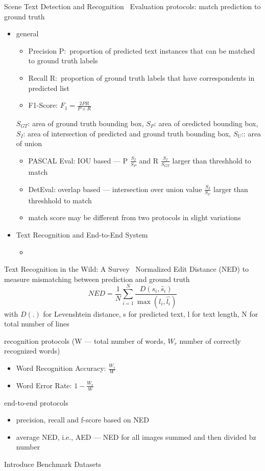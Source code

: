 Scene Text Detection and Recognition~\citep{long_scene_2021}
Evaluation protocols: match prediction to ground truth
\begin{itemize}
    \item general
        \begin{itemize}
            \item Precision P:\ proportion of predicted text instances that can be matched to ground
                truth labels
            \item Recall R:\ proportion of ground truth labels that have correspondents in predicted
                list
            \item F1-Score: $F_1=\frac{2PR}{P+R}$
        \end{itemize}
        $S_{GT}$: area of ground truth bounding box, $S_P$: area of oredicted bounding box,
        $S_I$: area of intersection of predicted and ground truth bounding box, $S_U$:: area of union
        \begin{itemize}
            \item PASCAL Eval: IOU based --- P $\frac{S_I}{S_P}$ and R $\frac{S_I}{S_{GT}}$ larger
                than threshhold to match
            \item DetEval: overlap based --- intersection over union value $\frac{S_I}{S_U}$
                larger than threshhold to match
            \item match score may be different from two protocols in slight variations
        \end{itemize}
    \item Text Recognition and End-to-End System
        \begin{itemize}
            \item %
        \end{itemize}
\end{itemize}

Text Recognition in the Wild: A Survey~\citep{chen_text_2021}
Normalized Edit Distance (NED) to measure mismatching between prediction and ground truth
\[NED = \frac{1}{N}\sum_{i=1}^N \frac{D(s_i,\hat{s}_i)}{\max(l_i,\hat{l_i})}\]
with $D(.)$ for Levenshtein distance, s for predicted text, l for text length, N for total number of lines

recognition protocols (W --- total number of words, $W_r$ number of correctly recognized words)
\begin{itemize}
    \item Word Recognition Accuracy: $\frac{W_r}{W}$
    \item Word Error Rate: $1 - \frac{W_r}{W}$
\end{itemize}
end-to-end protocols
\begin{itemize}
    \item precision, recall and f-score based on NED
    \item average NED, i.e., AED --- NED for all images summed and then divided bz number
\end{itemize}

Introduce Benchmark Datasets
